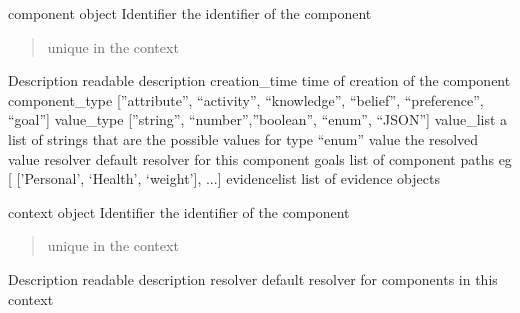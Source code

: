 \documentclass[letterpaper,10pt,english]{sphinxmanual}
\begin{document}
\begin{fulllineitems}
\label{API:personis.client.Component}
component object
Identifier  the identifier of the component
\begin{quote}

unique in the context
\end{quote}

Description readable description
creation\_time   time of creation of the component
component\_type  {[}''attribute'', ``activity'', ``knowledge'', ``belief'', ``preference'', ``goal''{]}
value\_type  {[}''string'', ``number'',''boolean'', ``enum'', ``JSON''{]}
value\_list    a list of strings that are the possible values for type ``enum''
value       the resolved value
resolver    default resolver for this component
goals       list of component paths eg {[} {[}'Personal', `Health', `weight'{]}, ...{]}
evidencelist    list of evidence objects

\end{fulllineitems}


\begin{fulllineitems}
\label{API:personis.client.Context}
context object
Identifier  the identifier of the component
\begin{quote}

unique in the context
\end{quote}

Description readable description
resolver    default resolver for components in this context

\end{fulllineitems}

\end{document}
